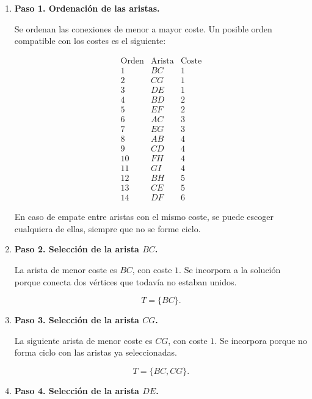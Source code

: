 \begin{enumerate}
\item \textbf{Paso 1. Ordenación de las aristas.}


Se ordenan las conexiones de menor a mayor coste. Un posible orden compatible con los costes es el siguiente:

\[
\begin{array}{c|c|c}
\text{Orden} & \text{Arista} & \text{Coste}\\
\hline
1 & BC & 1\\
2 & CG & 1\\
3 & DE & 1\\
4 & BD & 2\\
5 & EF & 2\\
6 & AC & 3\\
7 & EG & 3\\
8 & AB & 4\\
9 & CD & 4\\
10 & FH & 4\\
11 & GI & 4\\
12 & BH & 5\\
13 & CE & 5\\
14 & DF & 6
\end{array}
\]

En caso de empate entre aristas con el mismo coste, se puede escoger cualquiera de ellas, siempre que no se forme ciclo.

\grafoLogiMaxBase

\item \textbf{Paso 2. Selección de la arista $BC$.}

La arista de menor coste es $BC$, con coste $1$. Se incorpora a la solución porque conecta dos vértices que todavía no estaban unidos.

\[
T=\{BC\}.
\]


\item \textbf{Paso 3. Selección de la arista $CG$.}

La siguiente arista de menor coste es $CG$, con coste $1$. Se incorpora porque no forma ciclo con las aristas ya seleccionadas.

\[
T=\{BC,CG\}.
\]


\item \textbf{Paso 4. Selección de la arista $DE$.}


\end{enumerate}

